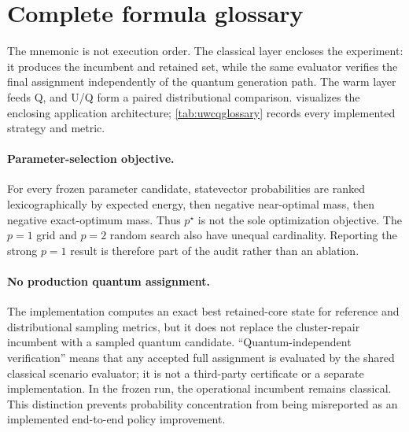 \section{Complete \UWCQ{} formula glossary}
\label{app:uwcq}

The mnemonic is not execution order. The classical layer encloses the experiment: it produces the incumbent and retained set, while the same evaluator verifies the final assignment independently of the quantum generation path. The warm layer feeds Q, and U/Q form a paired distributional comparison.  visualizes the enclosing application architecture; \cref{tab:uwcqglossary} records every implemented strategy and metric.



\paragraph{Parameter-selection objective.}
For every frozen parameter candidate, statevector probabilities are ranked lexicographically by expected energy, then negative near-optimal mass, then negative exact-optimum mass. Thus $p^\star$ is not the sole optimization objective. The $p=1$ grid and $p=2$ random search also have unequal cardinality. Reporting the strong $p=1$ result is therefore part of the audit rather than an ablation.

\paragraph{No production quantum assignment.}
The implementation computes an exact best retained-core state for reference and distributional sampling metrics, but it does not replace the cluster-repair incumbent with a sampled quantum candidate. ``Quantum-independent verification'' means that any accepted full assignment is evaluated by the shared classical scenario evaluator; it is not a third-party certificate or a separate implementation. In the frozen run, the operational incumbent remains classical. This distinction prevents probability concentration from being misreported as an implemented end-to-end policy improvement.
